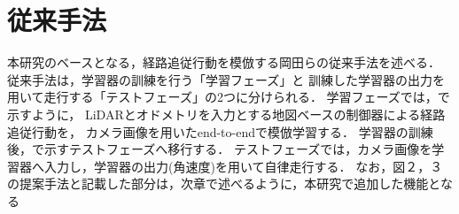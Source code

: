 \documentclass[10pt]{jarticle}
\begin{document}
    \section{従来手法}%
    本研究のベースとなる，経路追従行動を模倣する岡田らの従来手法を述べる．
    従来手法は，学習器の訓練を行う「学習フェーズ」と
    訓練した学習器の出力を用いて走行する「テストフェーズ」の2つに分けられる．
    学習フェーズでは，で示すように，
    LiDARとオドメトリを入力とする地図ベースの制御器による経路追従行動を，
    カメラ画像を用いたend-to-endで模倣学習する．
    学習器の訓練後，で示すテストフェーズへ移行する．
    テストフェーズでは，カメラ画像を学習器へ入力し，学習器の出力(角速度)を用いて自律走行する．
    なお，図２，３の提案手法と記載した部分は，次章で述べるように，本研究で追加した機能となる
    
    
\end{document}
